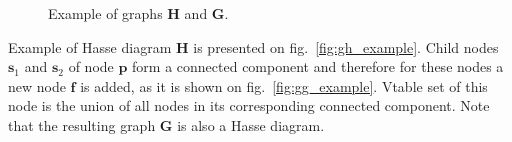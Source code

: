 \documentclass[10pt, conference]{IEEEtran}
\newcommand{\ib}[1]{\textbf{#1}}
\newcommand{\gG}{\ib{G}}
\newcommand{\gH}{\ib{H}}
\newcommand{\gf}{\ib{f}}
\newcommand{\gp}{\ib{p}}
\newcommand{\gs}{\ib{s}}
\begin{document}
\begin{figure}[tb!]
\begin{center}
  \end{center}
\caption{Example of graphs $\gH$ and $\gG$.}
\label{fig:gg_tree}
\end{figure}

Example of Hasse diagram $\gH$ is presented on fig.~\ref{fig:gh_example}. Child nodes
$\gs_1$ and $\gs_2$ of node $\gp$ form a connected component and therefore for these
nodes a new node $\gf$ is added, as it is shown on fig.~\ref{fig:gg_example}.
Vtable set of this node is the union of all nodes in its corresponding connected
component. Note that the resulting graph $\gG$ is also a Hasse diagram.
\end{document}
